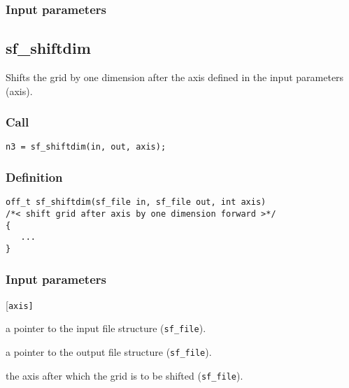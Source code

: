 \subsubsection*{Input parameters}




\subsection{{sf\_shiftdim}}
Shifts the grid by one dimension after the axis defined in the input parameters (axis). 

\subsubsection*{Call}
\begin{verbatim}n3 = sf_shiftdim(in, out, axis);\end{verbatim}

\subsubsection*{Definition}
\begin{verbatim}
off_t sf_shiftdim(sf_file in, sf_file out, int axis) 
/*< shift grid after axis by one dimension forward >*/
{
   ...
}
\end{verbatim}

\subsubsection*{Input parameters}
\begin{desclist}{\tt }{\quad}[\tt axis]
   \setlength\itemsep{0pt}
   \item[in]   a pointer to the input file structure (\texttt{sf\_file}). 
   \item[out]  a pointer to the output file structure (\texttt{sf\_file}). 
   \item[axis] the axis after which the grid is to be shifted (\texttt{sf\_file}).
\end{desclist}

